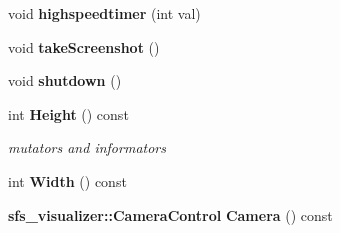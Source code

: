 \begin{DoxyCompactItemize}
\item 
void {\bfseries highspeedtimer} (int val)\label{classsfs__visualizer_1_1RenderEngine_a398a0c9a6afb6b59e2d0914f1d85e8dc}

\item 
void {\bfseries take\-Screenshot} ()\label{classsfs__visualizer_1_1RenderEngine_a143b5b846ac5622cf3981ba846e3e414}

\item 
void {\bfseries shutdown} ()\label{classsfs__visualizer_1_1RenderEngine_a2e2a2ee4bdc6f9e3a13a7570b0d577c0}

\item 
int {\bf Height} () const 
\begin{DoxyCompactList}\small\item\em mutators and informators \end{DoxyCompactList}\item 
int {\bfseries Width} () const \label{classsfs__visualizer_1_1RenderEngine_a14ae2c2a922499bedfb92a3870962531}

\item 
{\bf sfs\-\_\-visualizer\-::\-Camera\-Control} {\bfseries Camera} () const \label{classsfs__visualizer_1_1RenderEngine_a85627302dc9b06336a064a621fad5543}

\end{DoxyCompactItemize}
